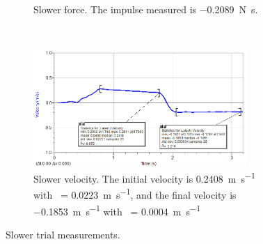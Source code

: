 \documentclass[12pt]{article}
\newcommand{\mps}[1]{\SI{#1}{\meter\per\second}}
\newcommand{\impls}[1]{\SI{#1}{\newton\second}}
\begin{document}
\begin{enumerate}
\begin{figure}[H]
\begin{subfigure}[t]{0.5\textwidth}
                \caption{Slower force. The impulse measured is \impls{-0.2089}.}
            \end{subfigure}%
            ~
            \begin{subfigure}[t]{0.5\textwidth}
                \centering
                \includegraphics[width=3.2in]{slower_velo}
                \caption{Slower velocity. The initial velocity is \mps{0.2408} with \textsigma\ = \mps{0.0223}, and the final velocity is \mps{-.1853} with \textsigma\ = \mps{0.0004}}
            \end{subfigure}
            \caption{Slower trial measurements.}
        \end{figure}
    \end{enumerate}
\end{document}
